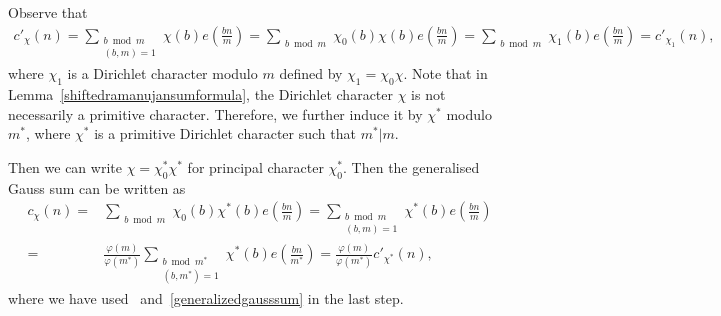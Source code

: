 \documentclass[12pt, oneside,reqno]{amsart}
\numberwithin{equation}{section}
\begin{document}
Observe that
\begin{align}\label{cc'relation}
c'_{\chi}(n)
=\sum_{\substack{b\bmod{m}\\(b,m)=1}}\chi(b)e\left(\frac{bn}{m}\right)
=\sum_{\substack{b\bmod{m}}}\chi_0(b)\chi(b)e\left(\frac{bn}{m}\right)
=\sum_{\substack{b\bmod{m}}}\chi_1(b)e\left(\frac{bn}{m}\right)
=c'_{\chi_1}(n),
\end{align}
where $\chi_1$ is a Dirichlet character modulo $m$ defined by $\chi_1=\chi_0\chi$. Note that in Lemma~\ref{shiftedramanujansumformula}, the Dirichlet character $\chi$ is not necessarily a primitive character. Therefore, we further induce it by $\chi^*$ modulo $m^*$, where 
$\chi^*$ is a primitive Dirichlet character such that $m^*|m$.


Then we can write $\chi=\chi^*_0\chi^{*}$ for principal character $\chi^*_0$. Then the generalised Gauss sum can be written as
\begin{align}\label{charactersumdecomposition}
c_{{\chi}}(n)
=&\sum_{\substack{b\bmod{m}}}{\chi}_0(b)\chi^{*}(b)e\left(\frac{bn}{m}\right)
=\sum_{\substack{b\bmod{m}\\(b,m)=1}}\chi^{*}(b)e\left(\frac{bn}{m}\right)\nonumber\\
=&\frac{\varphi(m)}{\varphi(m^*)}\sum_{\substack{b\bmod{m^*}\\(b,m^*)=1}}\chi^{*}(b)e\left(\frac{bn}{m^*}\right)
=\frac{\varphi(m)}{\varphi(m^*)}c'_{\chi^*}(n),
\end{align}
where we have used~\cite[Theorem 5.33(a)]{apostol} and~\eqref{generalizedgausssum} in the last step. 

\end{document}
